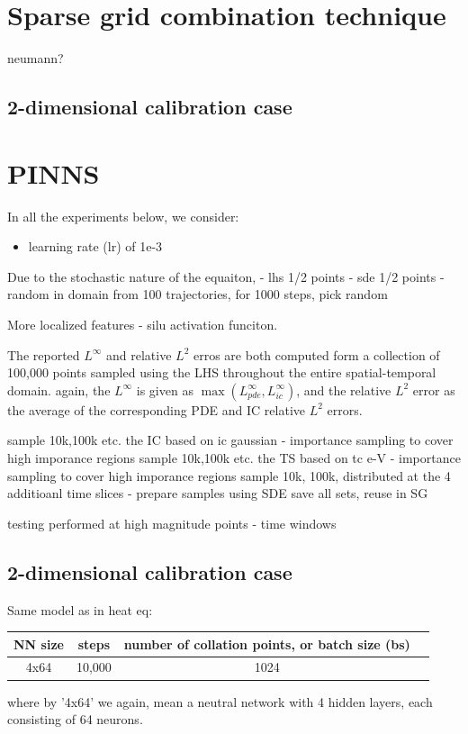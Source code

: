\section{Sparse grid combination technique}

neumann?


\subsection{2-dimensional calibration case}


\section{PINNS}

In all the experiments below, we consider:

\begin{itemize}
\item learning rate (lr) of 1e-3
\end{itemize}

Due to the stochastic nature of the equaiton,
- lhs 1/2 points
- sde 1/2 points - random in domain from 100 trajectories, for 1000 steps, pick random

More localized features - silu activation funciton.

The reported $L^\infty$ and relative $L^2$ erros are both computed form a collection of
100,000 points sampled using the LHS throughout the entire spatial-temporal domain.
again, the $L^\infty$ is given as $\max(L^\infty_{pde}, L^\infty_{ic})$, and
the relative $L^2$ error as the average of the corresponding PDE and IC relative $L^2$ errors.


sample 10k,100k etc. the IC based on ic gaussian - importance sampling to cover high imporance regions
sample 10k,100k etc. the TS based on tc e-V - importance sampling to cover high imporance regions
sample 10k, 100k, distributed at the 4 additioanl time slices
- prepare samples using SDE
save all sets, reuse in SG

testing performed at high magnitude points
- time windows

\subsection{2-dimensional calibration case}

Same model as in heat eq:
\begin{center}
\begin{tabular}{ |c|c|c|c } 
\hline
NN size & steps & number of collation points, or batch size (bs)\\
\hline
4x64  & 10,000 & 1024 \\
\hline
\end{tabular}
\end{center}
where by '4x64' we again, mean a neutral network with 4 hidden layers,
each consisting of 64 neurons.

